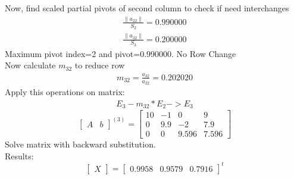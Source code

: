 \documentclass{article}
\begin{document}
Now, find scaled partial pivots of second column to check if need interchanges
\begin{align}
	\frac{\|a_{22}\|}{S_{2}}=0.990000\\
	\frac{\|a_{32}\|}{S_{3}}=0.200000
\end{align}
Maximum pivot index=2 and pivot=0.990000. No Row Change\\
Now calculate $m_{32}$ to reduce row 
\begin{align}
	m_{32}=\frac{a_{32}}{a_{22}}=0.202020
\end{align}
Apply this operations on matrix:
\begin{align}
	E_{3}-m_{32}*E_{2}->E_{3}
\end{align}
\[
\left[
\begin{array}{c|c}
A&b
\end{array}
\right]^{(3)}
=
\left[
\begin{array}{ccc|c}
	10&-1&0&9\\
	0&9.9&-2&7.9\\
	0&0&9.596&7.596 
\end{array}
\right]
\]
Solve matrix with backward substitution.\\
Results:
\[
\begin{bmatrix}
X
\end{bmatrix}
=
\begin{bmatrix}
	0.9958&0.9579&0.7916
\end{bmatrix}^t
\]
\end{document}
